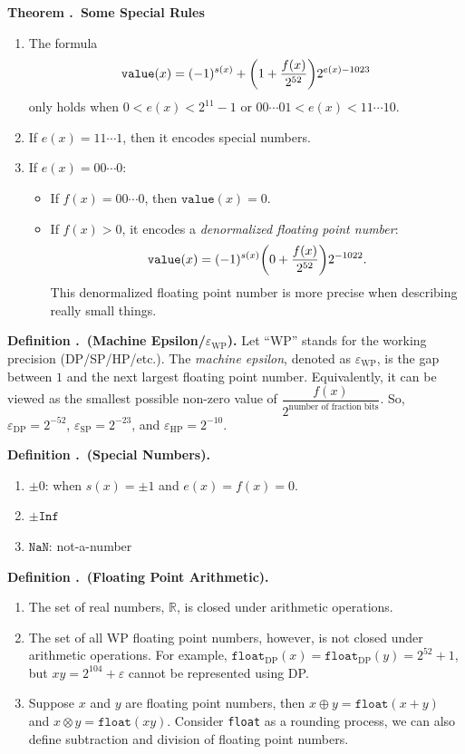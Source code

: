 \documentclass[12pt, a4paper]{article}
\newcounter{index}[subsection]
\newenvironment*{df}[1]{\par\noindent\textbf{Definition \thesubsection.\stepcounter{index}\theindex\ (#1).}}{\par}
\newenvironment*{thm}[1]{\begin{tcolorbox}\par\noindent\textbf{Theorem \thesubsection.\stepcounter{index}\theindex\ #1} \par}{\par\end{tcolorbox}}
\def\R{{\mathbb{R}}}
\def\Inf{\texttt{Inf}}
\def\NaN{\texttt{NaN}}
\def\epsilon{\varepsilon}
\begin{document}
\begin{thm}{Some Special Rules}
	\begin{enumerate}
		\item The formula \[\texttt{value}(x)=(-1)^{s(x)}+\qty(1+\dfrac{f(x)}{2^{52}})2^{e(x)-1023}\] only holds when $0<e(x)<2^{11}-1$ or $00\cdots01<e(x)<11\cdots10$.
		\item If $e(x)=11\cdots1$, then it encodes special numbers.
		\item If $e(x)=00\cdots0$: 
		\begin{itemize}
			\item If $f(x)=00\cdots0$, then $\texttt{value}(x)=0$.
			\item If $f(x)>0$, it encodes a \textit{denormalized floating point number}: \[\texttt{value}(x)=(-1)^{s(x)}\qty(0+\dfrac{f(x)}{2^{52}})2^{-1022}.\] This denormalized floating point number is more precise when describing really small things. 
		\end{itemize}
	\end{enumerate}
\end{thm}
\begin{df}{Machine Epsilon/$\epsilon_\text{WP}$}
	Let ``WP'' stands for the working precision (DP/SP/HP/etc.). The \textit{machine epsilon}, denoted as $\epsilon_\text{WP}$, is the gap between $1$ and the next largest floating point number. Equivalently, it can be viewed as the smallest possible non-zero value of $\dfrac{f(x)}{2^\text{number of fraction bits}}$. So, $\epsilon_\text{DP}=2^{-52}$, $\epsilon_\text{SP}=2^{-23}$, and $\epsilon_\text{HP}=2^{-10}$.
\end{df}
\begin{df}{Special Numbers}
	\begin{enumerate}
		\item $\pm0$: when $s(x)=\pm1$ and $e(x)=f(x)=0$.
		\item $\pm\Inf$
		\item $\NaN$: not-a-number
	\end{enumerate}	
\end{df}
\begin{df}{Floating Point Arithmetic}
	\begin{enumerate}
		\item The set of real numbers, $\R$, is closed under arithmetic operations.
		\item The set of all WP floating point numbers, however, is not closed under arithmetic operations. For example, $\texttt{float}_\text{DP}(x)=\texttt{float}_\text{DP}(y)=2^{52}+1$, but $xy=2^{104}+\epsilon$ cannot be represented using DP. 
		\item Suppose $x$ and $y$ are floating point numbers, then $x\oplus y=\texttt{float}(x+y)$ and $x\otimes y=\texttt{float}(xy)$. Consider \texttt{float} as a rounding process, we can also define subtraction and division of floating point numbers. 
	\end{enumerate}	
\end{df}
\end{document}
